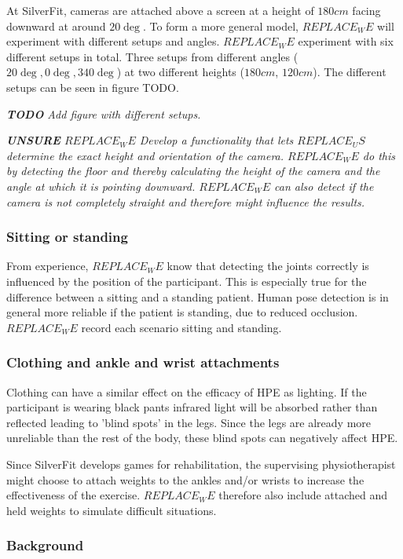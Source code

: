 At SilverFit, cameras are attached above a screen at a height of $180 cm$ facing downward at around $20\deg$. To form a more general model, $REPLACE_WE$ will experiment with different setups and angles. $REPLACE_WE$ experiment with six different setups in total. Three setups from different angles ($20\deg, 0\deg, 340\deg$) at two different heights ($180cm$, $120cm$). The different setups can be seen in figure TODO.

\textit{\textbf{TODO} Add figure with different setups.}

\textit{
  \textbf{UNSURE} $REPLACE_WE$ Develop a functionality that lets $REPLACE_US$ determine the exact height and orientation of the camera. $REPLACE_WE$ do this by detecting the floor and thereby calculating the height of the camera and the angle at which it is pointing downward. $REPLACE_WE$ can also detect if the camera is not completely straight and therefore might influence the results.
}

\subsubsection{Sitting or standing}

From experience, $REPLACE_WE$ know that detecting the joints correctly is influenced by the position of the participant. This is especially true for the difference between a sitting and a standing patient. Human pose detection is in general more reliable if the patient is standing, due to reduced occlusion. $REPLACE_WE$ record each scenario sitting and standing.

\subsubsection{Clothing and ankle and wrist attachments}

Clothing can have a similar effect on the efficacy of HPE as lighting. If the participant is wearing black pants infrared light will be absorbed rather than reflected leading to 'blind spots' in the legs. Since the legs are already more unreliable than the rest of the body, these blind spots can negatively affect HPE. 

Since SilverFit develops games for rehabilitation, the supervising physiotherapist might choose to attach weights to the ankles and/or wrists to increase the effectiveness of the exercise. $REPLACE_WE$ therefore also include attached and held weights to simulate difficult situations.

\subsubsection{Background}

